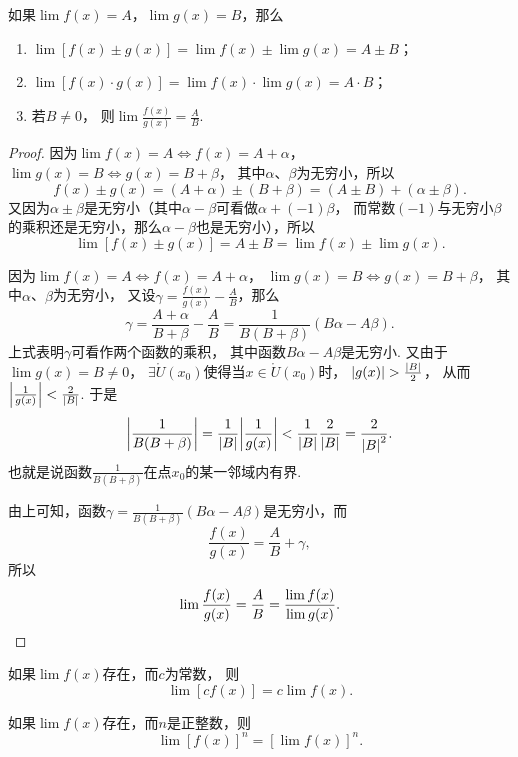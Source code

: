\begin{theorem}\label{theorem:极限.极限的四则运算法则}
如果\(\lim f(x)=A\)，\(\lim g(x)=B\)，那么\begin{enumerate}
	\item \(\lim [f(x) \pm g(x)] = \lim f(x) \pm \lim g(x) = A \pm B\)；
	\item \(\lim [f(x) \cdot g(x)] = \lim f(x) \cdot \lim g(x) = A \cdot B\)；
	\item 若\(B\neq0\)，
	则\(\lim \frac{f(x)}{g(x)} = \frac{A}{B}\).
\end{enumerate}
\begin{proof}
因为\(\lim f(x)=A \iff f(x)=A+\alpha\)，\(\lim g(x)=B \iff g(x)=B+\beta\)，
其中\(\alpha\)、\(\beta\)为无穷小，所以\[
	f(x) \pm g(x) = (A+\alpha)\pm(B+\beta) = (A \pm B) + (\alpha \pm \beta).
\]
又因为\(\alpha\pm\beta\)是无穷小（其中\(\alpha-\beta\)可看做\(\alpha+(-1)\beta\)，
而常数\((-1)\)与无穷小\(\beta\)的乘积还是无穷小，那么\(\alpha-\beta\)也是无穷小），所以\[
	\lim [f(x) \pm g(x)] = A \pm B = \lim f(x) \pm \lim g(x).
\]

因为\(\lim f(x)=A \iff f(x)=A+\alpha\)，
\(\lim g(x)=B \iff g(x)=B+\beta\)，
其中\(\alpha\)、\(\beta\)为无穷小，
又设\(\gamma = \frac{f(x)}{g(x)} - \frac{A}{B}\)，那么\[
	\gamma = \frac{A+\alpha}{B+\beta} - \frac{A}{B}
	= \frac{1}{B(B+\beta)} (B \alpha - A \beta).
\]
上式表明\(\gamma\)可看作两个函数的乘积，
其中函数\(B \alpha - A \beta\)是无穷小.
又由于\(\lim g(x) = B \neq 0\)，
\(\exists \mathring{U}(x_0)\)使得当\(x\in\mathring{U}(x_0)\)时，
\(\abs{g(x)}>\frac{\abs{B}}{2}\)，
从而\(\abs{\frac{1}{g(x)}}<\frac{2}{\abs{B}}\).
于是\[
	\abs{\frac{1}{B(B+\beta)}}
	=\frac{1}{\abs{B}} \abs{\frac{1}{g(x)}}
	<\frac{1}{\abs{B}} \frac{2}{\abs{B}}
	=\frac{2}{\abs{B}^2}.
\]
也就是说函数\(\frac{1}{B(B+\beta)}\)在点\(x_0\)的某一邻域内有界.

由上可知，函数\(\gamma = \frac{1}{B(B+\beta)} (B \alpha - A \beta)\)是无穷小，而\[
\frac{f(x)}{g(x)} = \frac{A}{B} + \gamma,
\]所以\[
\lim\frac{f(x)}{g(x)} = \frac{A}{B} = \frac{\lim f(x)}{\lim g(x)}.
\qedhere
\]
\end{proof}
\end{theorem}

\begin{corollary}
如果\(\lim f(x)\)存在，而\(c\)为常数，
则\[\lim [c f(x)] = c \lim f(x).\]
\end{corollary}

\begin{corollary}
如果\(\lim f(x)\)存在，而\(n\)是正整数，则\[\lim [f(x)]^n = [\lim f(x)]^n.\]
\end{corollary}

